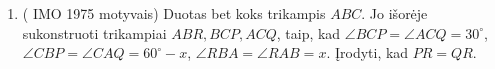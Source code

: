 \begin{enumerate}
\item  ( IMO 1975 motyvais) Duotas bet koks trikampis $ABC$. Jo išorėje 
  sukonstruoti trikampiai $ABR,BCP,ACQ$, taip, kad $\angle BCP=\angle 
   ACQ=30^\circ$, $\angle CBP=\angle CAQ=60^\circ-x$, $\angle RBA=\angle 
   RAB=x$. Įrodyti, kad $PR=QR$.

\end{enumerate}
